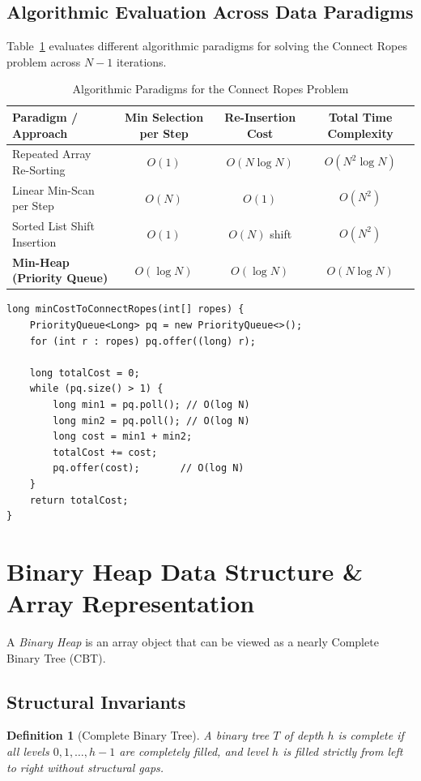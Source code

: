 \documentclass[10pt,journal,compsoc,onecolumn]{IEEEtran}
\newtheorem{definition}[theorem]{Definition}
\begin{document}
\subsection{Algorithmic Evaluation Across Data Paradigms}
Table~\ref{tab:ropes-paradigms} evaluates different algorithmic paradigms for solving the Connect Ropes problem across $N-1$ iterations.

\begin{table}[htbp]
\centering
\caption{Algorithmic Paradigms for the Connect Ropes Problem}
\label{tab:ropes-paradigms}
\begin{tabular}{lccc}
\toprule
\textbf{Paradigm / Approach} & \textbf{Min Selection per Step} & \textbf{Re-Insertion Cost} & \textbf{Total Time Complexity} \\
\midrule
Repeated Array Re-Sorting & $O(1)$ & $O(N \log N)$ & $O(N^2 \log N)$ \\
Linear Min-Scan per Step & $O(N)$ & $O(1)$ & $O(N^2)$ \\
Sorted List Shift Insertion & $O(1)$ & $O(N)$ shift & $O(N^2)$ \\
\textbf{Min-Heap (Priority Queue)} & $O(\log N)$ & $O(\log N)$ & $O(N \log N)$ \\
\bottomrule
\end{tabular}
\end{table}

\begin{verbatim}
long minCostToConnectRopes(int[] ropes) {
    PriorityQueue<Long> pq = new PriorityQueue<>();
    for (int r : ropes) pq.offer((long) r);
    
    long totalCost = 0;
    while (pq.size() > 1) {
        long min1 = pq.poll(); // O(log N)
        long min2 = pq.poll(); // O(log N)
        long cost = min1 + min2;
        totalCost += cost;
        pq.offer(cost);       // O(log N)
    }
    return totalCost;
}
\end{verbatim}

\section{Binary Heap Data Structure \& Array Representation}
\label{sec:binary-heap-structure}

A \emph{Binary Heap} is an array object that can be viewed as a nearly Complete Binary Tree (CBT).

\subsection{Structural Invariants}
\begin{definition}[Complete Binary Tree]
A binary tree $T$ of depth $h$ is complete if all levels $0, 1, \dots, h-1$ are completely filled, and level $h$ is filled strictly from left to right without structural gaps.
\end{definition}
\end{document}
